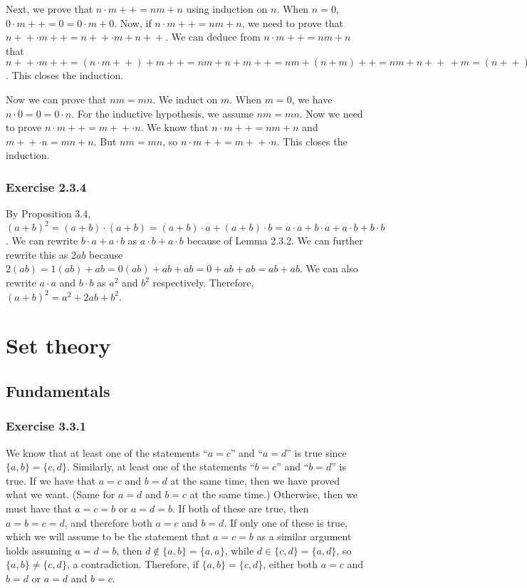 \documentclass[12pt, oneside]{book}
\newcommand{\increment}{\! + \! +}
\begin{document}
	Next, we prove that $n \cdot m \increment = nm + n$ using induction on $n$. When $n = 0$, $0 \cdot m \increment = 0 = 0 \cdot m + 0$. Now, if $n \cdot m \increment = nm + n$, we need to prove that $n \increment \cdot m \increment = n \increment \cdot m + n \increment$. We can deduce from $n \cdot m \increment = nm + n$ that $n \increment \cdot m \increment = (n \cdot m \increment) + m \increment = nm + n + m \increment = nm + (n + m) \increment = nm + n \increment \, + m = (n \increment) \cdot m + n \increment$. This closes the induction.
	
	Now we can prove that $nm = mn$. We induct on $m$. When $m = 0$, we have $n \cdot 0 = 0 = 0 \cdot n$. For the inductive hypothesis, we assume $nm = mn$. Now we need to prove $n \cdot m \increment = m \increment \cdot n$. We know that $n \cdot m \increment = nm + n$ and $m \increment \cdot n = mn + n$. But $nm = mn$, so $n \cdot m \increment = m \increment \cdot n$. This closes the induction.
	
	\subsection*{Exercise 2.3.4}
	
	By Proposition 3.4, $(a + b)^2 = (a + b)  \cdot (a + b) = (a + b) \cdot a + (a + b) \cdot b = a \cdot a + b \cdot a + a \cdot b + b \cdot b$. We can rewrite $b \cdot a + a \cdot b$ as $a \cdot b + a \cdot b$ because of Lemma 2.3.2. We can further rewrite this as $2ab$ because $2(ab) = 1(ab) + ab = 0(ab) + ab + ab = 0 + ab + ab = ab + ab$. We can also rewrite $a \cdot a$ and $b \cdot b$ as $a^2$ and $b^2$ respectively. Therefore, $(a + b)^2 = a^2 + 2ab + b^2$.
	
	\chapter{Set theory}
	
	\section{Fundamentals}
	
	\subsection*{Exercise 3.3.1}
	
	We know that at least one of the statements ``$a = c$'' and ``$a = d$'' is true since $\{a, b\} = \{c, d\}$. Similarly, at least one of the statements ``$b = c$'' and ``$b = d$'' is true. If we have that $a = c$ and $b = d$ at the same time, then we have proved what we want. (Same for $a = d$ and $b = c$ at the same time.) Otherwise, then we must have that $a = c = b$ or $a = d = b$. If both of these are true, then $a = b = c = d$, and therefore both $a = c$ and $b = d$. If only one of these is true, which we will assume to be the statement that $a = c = b$ as a similar argument holds assuming $a = d = b$, then $d \notin \{a, b\} = \{a, a\}$, while $d \in \{c, d\} = \{a, d\}$, so $\{a, b\} \ne \{c, d\}$, a contradiction. Therefore, if $\{a, b\} = \{c, d\}$, either both $a = c$ and $b = d$ or $a = d$ and $b = c$.
	
\end{document}
